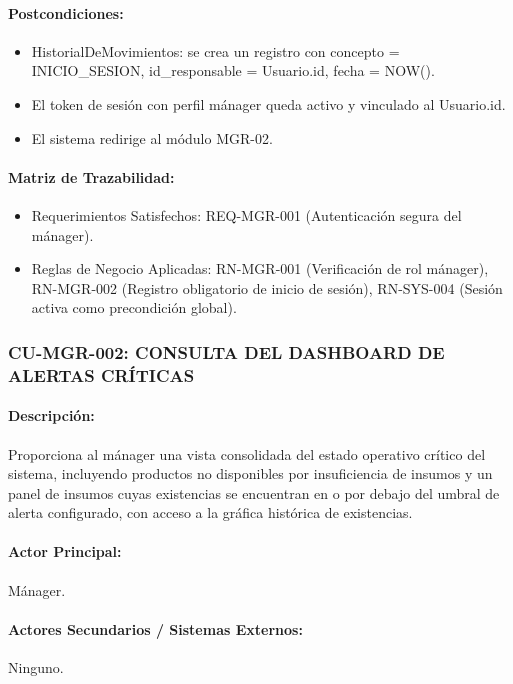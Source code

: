 \paragraph{Postcondiciones:}
\begin{itemize}
    \item HistorialDeMovimientos: se crea un registro con concepto = INICIO\_SESION, id\_responsable = Usuario.id, fecha = NOW().
    \item El token de sesión con perfil mánager queda activo y vinculado al Usuario.id.
    \item El sistema redirige al módulo MGR-02.
\end{itemize}

\paragraph{Matriz de Trazabilidad:}
\begin{itemize}
    \item Requerimientos Satisfechos: REQ-MGR-001 (Autenticación segura del mánager).
    \item Reglas de Negocio Aplicadas: RN-MGR-001 (Verificación de rol mánager), RN-MGR-002 (Registro obligatorio de inicio de sesión), RN-SYS-004 (Sesión activa como precondición global).
\end{itemize}

\subsubsection{CU-MGR-002: CONSULTA DEL DASHBOARD DE ALERTAS CRÍTICAS}
\paragraph{Descripción:} Proporciona al mánager una vista consolidada del estado operativo crítico del sistema, incluyendo productos no disponibles por insuficiencia de insumos y un panel de insumos cuyas existencias se encuentran en o por debajo del umbral de alerta configurado, con acceso a la gráfica histórica de existencias.

\paragraph{Actor Principal:} Mánager.

\paragraph{Actores Secundarios / Sistemas Externos:} Ninguno.

